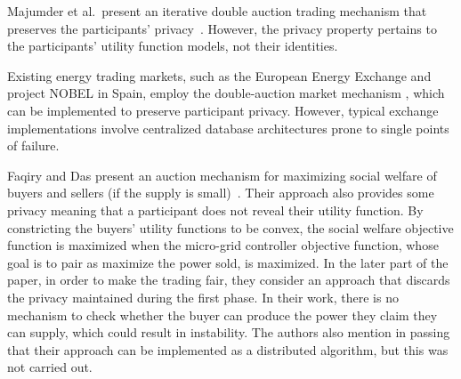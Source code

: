 Majumder et al.\ present an iterative double auction trading mechanism that preserves the participants' privacy~\cite{majumder_efficient_2014}. However, the privacy property pertains to the participants' utility function models, not their identities. 

Existing energy trading markets, such as the European Energy Exchange \cite{EPEX_SPOT_operation} and project NOBEL in Spain, employ the double-auction market mechanism \cite{Ilic12}, which can be implemented to preserve participant privacy. However, typical exchange implementations involve centralized database architectures prone to single points of failure.
 

Faqiry and Das present an auction mechanism for maximizing social welfare of buyers and sellers (if the supply is small)~\cite{faqiry_transactive_2016}. Their approach also provides some privacy meaning that a participant does not reveal their utility function. By constricting the buyers' utility functions to be convex, the social welfare objective function is maximized when the micro-grid controller objective function, whose goal is to pair as maximize the power sold, is maximized. In the later part of the paper, in order to make the trading fair, they consider an approach that discards the privacy maintained during the first phase. In their work, there is no mechanism to check whether the buyer can produce the power they claim they can supply, which could result in instability. The authors also mention in passing that their approach can be implemented as a distributed algorithm, but this was not carried out. 

